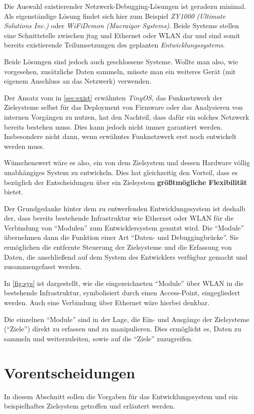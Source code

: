 Die Auswahl existierender Netzwerk-Debugging-Lösungen ist geradezu
minimal. Als eigenständige Lösung findet sich hier zum Beispiel \emph{ZY1000
(Ultimate Solutions Inc.)}\cite{ULT} oder \emph{WiFiDemon (Macraigor
Systems)}\cite{MAC}. Beide Systeme stellen eine Schnittstelle zwischen
\gls{jtag} und Ethernet oder WLAN dar und sind somit bereits existierende
Teilumsetzungen des geplanten \emph{Entwicklungssystems}.

Beide Lösungen sind jedoch auch geschlossene Systeme. Wollte man also, wie
vorgesehen, zusätzliche Daten sammeln, müsste man ein weiteres Gerät (mit
eigenem Anschluss an das Netzwerk) verwenden.

Der Ansatz vom in \autoref{sec:exist} erwähnten \emph{TinyOS}, das Funknetzwerk
der Zielsysteme selbst für das Deployment von Firmware oder das Analysieren von
internen Vorgängen zu nutzen, hat den Nachteil, dass dafür ein solches Netzwerk
bereits bestehen muss. Dies kann jedoch nicht immer garantiert werden.
Insbesondere nicht dann, wenn erwähntes Funknetzwerk erst noch entwickelt werden
muss.

Wünschenswert wäre es also, ein von dem Zielsystem und dessen Hardware völlig
unabhängiges System zu entwickeln. Dies hat gleichzeitig den Vorteil, dass es
bezüglich der Entscheidungen über ein Zielsystem \textbf{größtmögliche
Flexibilität} bietet.

Der Grundgedanke hinter dem zu entwerfenden Entwicklungssystem ist
deshalb der, dass bereits bestehende Infrastruktur wie Ethernet oder WLAN für
die Verbindung von "`Modulen"' zum Entwicklersystem genutzt wird. Die
"`Module"' übernehmen dann die Funktion einer Art "`Daten- und
Debuggingbrücke"'. Sie ermöglichen die entfernte Steuerung der Zielsysteme
und die Erfassung von Daten, die anschließend auf dem System des Entwicklers
verfügbar gemacht und zusammengefasst werden.

In \autoref{fig:sys} ist dargestellt, wie die eingezeichneten "`Module"'
über WLAN in die bestehende Infrastruktur, symbolisiert durch einen
Access-Point, eingegliedert werden. Auch eine Verbindung über Ethernet wäre
hierbei denkbar.

Die einzelnen "`Module"' sind in der Lage, die Ein- und Ausgänge
der Zielsysteme ("`Ziele"') direkt zu erfassen und zu manipulieren. Dies
ermöglicht es, Daten zu sammeln und weiterzuleiten, sowie auf die "`Ziele"'
zuzugreifen.
\section{Vorentscheidungen}
In diesem Abschnitt sollen die Vorgaben für das Entwicklungssystem und ein
beispielhaftes Zielsystem getroffen und erläutert werden.
